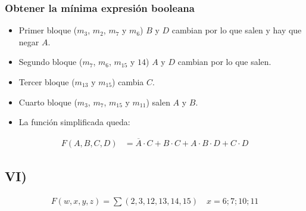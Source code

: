 \subsubsection{Obtener la mínima expresión booleana}
\begin{itemize}[nosep]
    \item Primer bloque ($m_3$, $m_2$, $m_7$ y $m_6$) $B$ y $D$ cambian por lo que salen y hay que negar $A$. 
    \item Segundo bloque ($m_7$, $m_6$, $m_15$ y $14$) $A$ y $D$ cambian por lo que salen.
    \item Tercer bloque ($m_13$ y $m_15$) cambia $C$.
    \item Cuarto bloque ($m_3$, $m_7$, $m_15$ y $m_11$) salen $A$ y $B$.
    \item La función simplificada queda:
\end{itemize}

{\Large\begin{align*}F(A,B,C,D) &= \overline{A}\cdot C + B\cdot C + A\cdot B\cdot D + C\cdot D\end{align*}}

\subsection{VI)}

{\Large\begin{align*}\displaystyle F(w, x, y, z) = \sum(2, 3, 12, 13, 14, 15) \quad x = 6; 7; 10; 11\end{align*}}

